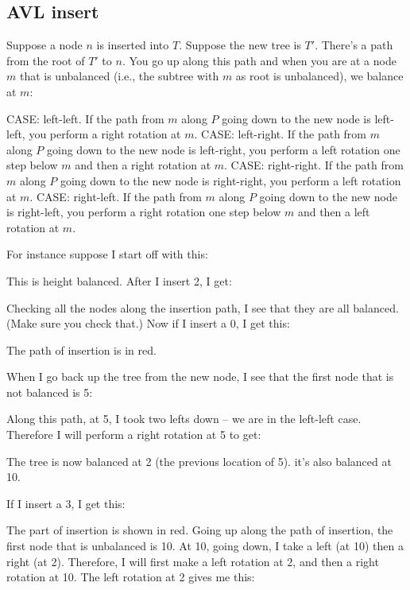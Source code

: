 \subsection{AVL insert}
Suppose a node $n$ is inserted into $T$.
Suppose the new tree is $T'$.
There's a path from the root of $T'$ to $n$.
You go up along this path and when you are at a node $m$
that is unbalanced (i.e., the subtree with $m$ as root
is unbalanced), we balance at $m$:
\begin{tightlist}
  \li CASE: left-left. If the path from $m$ along $P$ going down to the new node is
  left-left,
  you perform a right rotation at $m$.
  \li CASE: left-right. If the path from $m$ along $P$ going down to the new node is
  left-right,
  you perform a left rotation one step below $m$ and then a right rotation at $m$.
  \li CASE: right-right. If the path from $m$ along $P$ going down to the new node is
  right-right,
  you perform a left rotation at $m$.
  \li CASE: right-left. If the path from $m$ along $P$ going down to the new node is
  right-left,
  you perform a right rotation one step below $m$ and then a left rotation at $m$.
\end{tightlist}

For instance suppose I start off with this:



This is height balanced.
After I insert 2, I get:



Checking all the nodes along the insertion path,
I see that they are all balanced.
(Make sure you check that.)
Now if I insert a 0, I get this:



The path of insertion is in red.

When I go back up the tree from the new node, I see that
the first node that is not balanced is 5:



Along this path, at 5, I took two lefts down -- we are in the left-left case.
Therefore I will perform a right rotation at 5 to get:



The tree is now balanced at 2 (the previous location of 5).
it's also balanced at 10.

If I insert a 3, I get this:



The part of insertion is shown in red.
Going up along the path of insertion, the first node that is unbalanced
is 10.
At 10, going down, I take a left (at 10) then a right (at 2).
Therefore, I will first make a left rotation at 2, and then a right rotation at 10.
The left rotation at 2 gives me this:

